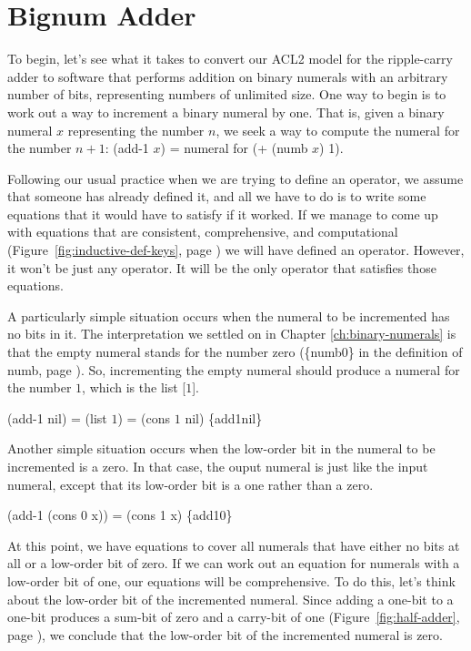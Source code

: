 \section{Bignum Adder}
\label{sec:bignum-adder}

To begin, let's see what it takes to convert our ACL2 model for
the ripple-carry adder to software that performs addition on
binary numerals with an arbitrary number of bits,
representing numbers of unlimited size.
One way to begin is to work out a way to increment a
binary numeral by one. That is, given a binary numeral $x$ representing
the number $n$, we seek a way to compute the numeral for the number $n+1$:
(add-1 $x$) = numeral for (+ (numb $x$) 1).

Following our usual practice when we are trying to define an operator,
we assume that someone has already defined it,
and all we have to do is to write some equations that it
would have to satisfy if it worked. If we manage
to come up with equations that are consistent, comprehensive, and computational
(Figure~\ref{fig:inductive-def-keys}, page \pageref{fig:inductive-def-keys})
we will have defined an operator.
However, it won't be just any operator.
It will be the only operator that satisfies those equations.

A particularly simple situation occurs when the numeral to be incremented
has no bits in it. The interpretation we settled on
in Chapter \ref{ch:binary-numerals} is that
the empty numeral stands for the number zero
(\{numb0\} in the definition of numb, page \pageref{nmb-defun}).
So, incrementing the empty numeral should produce a numeral for the number $1$,
which is the list [$1$].

\hspace{1cm}(add-1 nil) = (list $1$) = (cons $1$ nil)  \hfill \{add1nil\}

Another simple situation occurs when the low-order bit in the
numeral to be incremented is a zero.
In that case, the ouput numeral is
just like the input numeral, except that its
low-order bit is a one rather than a zero.

\hspace{1cm}  (add-1 (cons 0 x)) = (cons 1 x)    \hfill \{add10\}

At this point, we have equations to cover all numerals
that have either no bits at all or a low-order bit
of zero. If we can work out an equation for numerals
with a low-order bit of one, our equations will be comprehensive.
To do this, let's think about the
low-order bit of the incremented numeral.
Since adding a one-bit to a one-bit produces a sum-bit
of zero and a carry-bit of one
(Figure~\ref{fig:half-adder}, page \pageref{fig:half-adder}),
we conclude that the low-order bit of the incremented numeral
is zero.

